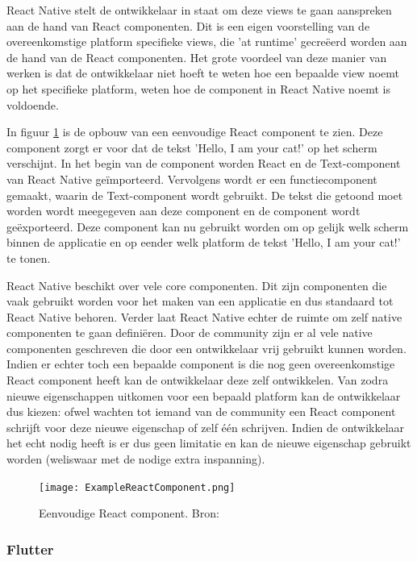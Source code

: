 React Native stelt de ontwikkelaar in staat om deze views te gaan aanspreken aan de hand van React componenten. Dit is een eigen voorstelling van de overeenkomstige platform specifieke views, die 'at runtime' gecreëerd worden aan de hand van de React componenten. Het grote voordeel van deze manier van werken is dat de ontwikkelaar niet hoeft te weten hoe een bepaalde view noemt op het specifieke platform, weten hoe de component in React Native noemt is voldoende. 

In figuur \ref{fig:reactComponent} is de opbouw van een eenvoudige React component te zien. Deze component zorgt er voor dat de tekst 'Hello, I am your cat!' op het scherm verschijnt. In het begin van de component worden React en de Text-component van React Native geïmporteerd. Vervolgens wordt er een functiecomponent gemaakt, waarin de Text-component wordt gebruikt. De tekst die getoond moet worden wordt meegegeven aan deze component en de component wordt geëxporteerd. Deze component kan nu gebruikt worden om op gelijk welk scherm binnen de applicatie en op eender welk platform de tekst 'Hello, I am your cat!' te tonen.


React Native beschikt over vele core componenten. Dit zijn componenten die vaak gebruikt worden voor het maken van een applicatie en dus standaard tot React Native behoren. Verder laat React Native echter de ruimte om zelf native componenten te gaan definiëren. Door de community zijn er al vele native componenten geschreven die door een ontwikkelaar vrij gebruikt kunnen worden. Indien er echter toch een bepaalde component is die nog geen overeenkomstige React component heeft kan de ontwikkelaar deze zelf ontwikkelen. Van zodra nieuwe eigenschappen uitkomen voor een bepaald platform kan de ontwikkelaar dus kiezen: ofwel wachten tot iemand van de community een React component schrijft voor deze nieuwe eigenschap of zelf één schrijven. Indien de ontwikkelaar het echt nodig heeft is er dus geen limitatie en kan de nieuwe eigenschap gebruikt worden (weliswaar met de nodige extra inspanning).

\begin{figure}
    \texttt{[image: ExampleReactComponent.png]}
    \caption{Eenvoudige React component. Bron:
        \textcite{ReactNative.dev2020}}
    \label{fig:reactComponent}
\end{figure}

\subsubsection{Flutter}
\label{subsubsec:opbouwUIFlutter}

